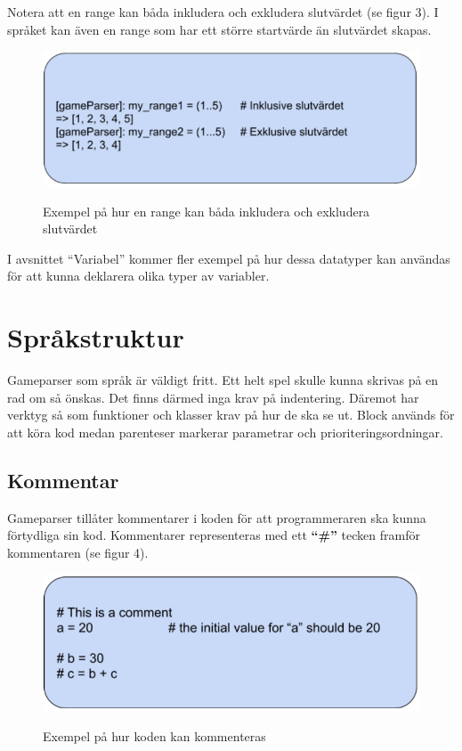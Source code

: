 \documentclass{Dokumentmall}
\begin{document}
Notera att en range kan båda inkludera och exkludera slutvärdet (se figur 3). I språket kan även en range som har ett större startvärde än slutvärdet skapas.
\begin{figure}[h!]
  \centering
  \includegraphics[scale = 0.65]{Images/Figur3.png}
  \label{}
  \caption{Exempel på hur en range kan båda inkludera och exkludera slutvärdet}
\end{figure}

I avsnittet “Variabel” kommer fler exempel på hur dessa datatyper kan användas för att kunna deklarera olika typer av variabler.

\newpage
\section{Språkstruktur}
Gameparser som språk är väldigt fritt. Ett helt spel skulle kunna skrivas på en rad om så önskas. Det finns därmed inga krav på indentering. Däremot har verktyg så som funktioner och klasser krav på hur de ska se ut. Block {} används för att köra kod medan parenteser markerar parametrar och prioriteringsordningar. 

\subsection{Kommentar}
Gameparser tillåter kommentarer i koden för att programmeraren ska kunna förtydliga sin kod. Kommentarer representeras med ett \textbf{``\#''} tecken framför kommentaren (se figur 4).

\begin{figure}[h!]
  \centering
  \includegraphics[scale = 0.65]{Images/Figur4.png}
  \label{}
  \caption{Exempel på hur koden kan kommenteras}
\end{figure}
\end{document}
